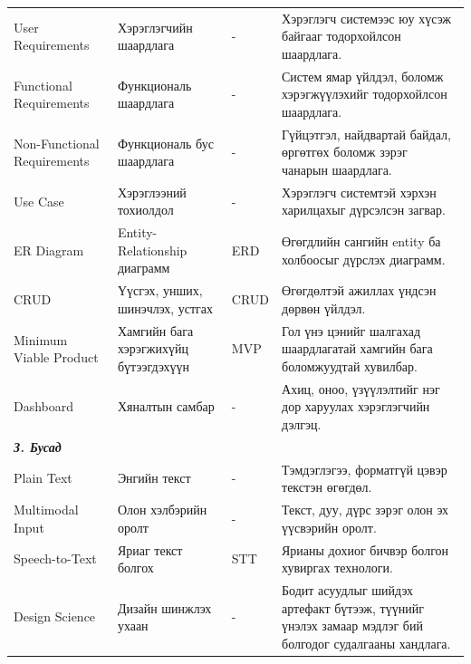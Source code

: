 {\begin{longtable}{p{} p{} p{} p{}}
User Requirements & Хэрэглэгчийн шаардлага & - & Хэрэглэгч системээс юу хүсэж байгааг тодорхойлсон шаардлага. \\

Functional Requirements & Функциональ шаардлага & - & Систем ямар үйлдэл, боломж хэрэгжүүлэхийг тодорхойлсон шаардлага. \\

Non-Functional Requirements & Функциональ бус шаардлага & - & Гүйцэтгэл, найдвартай байдал, өргөтгөх боломж зэрэг чанарын шаардлага. \\

Use Case & Хэрэглээний тохиолдол & - & Хэрэглэгч системтэй хэрхэн харилцахыг дүрсэлсэн загвар. \\

ER Diagram & Entity-Relationship диаграмм & ERD & Өгөгдлийн сангийн entity ба холбоосыг дүрслэх диаграмм. \\

CRUD & Үүсгэх, унших, шинэчлэх, устгах & CRUD & Өгөгдөлтэй ажиллах үндсэн дөрвөн үйлдэл. \\

Minimum Viable Product & Хамгийн бага хэрэгжихүйц бүтээгдэхүүн & MVP & Гол үнэ цэнийг шалгахад шаардлагатай хамгийн бага боломжуудтай хувилбар. \\

Dashboard & Хяналтын самбар & - & Ахиц, оноо, үзүүлэлтийг нэг дор харуулах хэрэглэгчийн дэлгэц. \\

\midrule
\multicolumn{4}{l}{\textbf{\textit{З. Бусад}}} \\
\midrule

Plain Text & Энгийн текст & - & Тэмдэглэгээ, форматгүй цэвэр текстэн өгөгдөл. \\

Multimodal Input & Олон хэлбэрийн оролт & - & Текст, дуу, дүрс зэрэг олон эх үүсвэрийн оролт. \\

Speech-to-Text & Яриаг текст болгох & STT & Ярианы дохиог бичвэр болгон хувиргах технологи. \\

Design Science & Дизайн шинжлэх ухаан & - & Бодит асуудлыг шийдэх артефакт бүтээж, түүнийг үнэлэх замаар мэдлэг бий болгодог судалгааны хандлага. \\

\bottomrule
\end{longtable}
}